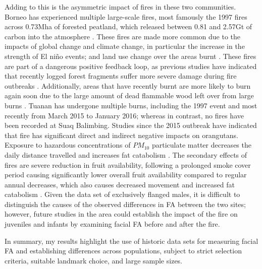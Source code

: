 Adding to this is the asymmetric impact of fires in these two communities. Borneo has experienced multiple large-scale fires, most famously the 1997 fires across 0.73Mha of forested peatland, which released between 0.81 and 2.57Gt of carbon into the atmosphere \citep{Page.2002}. These fires are made more common due to the impacts of global change and climate change, in particular the increase in the strength of El niño events; and land use change over the areas burnt \citep{Collins.2019, Siegert.2001}. These fires are part of a dangerous positive feedback loop, as previous studies have indicated that recently logged forest fragments suffer more severe damage during fire outbreaks \citep{Siegert.2001}. Additionally, areas that have recently burnt are more likely to burn again soon due to the large amount of dead flammable wood left over from large burns \citep{Cochrane.1999}. Tuanan has undergone multiple burns, including the 1997 event and most recently from March 2015 to January 2016; whereas in contrast, no fires have been recorded at Suaq Balimbing. Studies since the 2015 outbreak have indicated that fire has significant direct and indirect negative impacts on orangutans. Exposure to hazardous concentrations of \(PM_{10}\) particulate matter decreases the daily distance travelled and increases fat catabolism \citep{Erb.2018}. The secondary effects of fires are severe reduction in fruit availability, following a prolonged smoke cover period causing significantly lower overall fruit availability compared to regular annual decreases, which also causes decreased movement and increased fat catabolism \citep{Ashbury.2022}.
Given the data set of exclusively flanged males, it is difficult to distinguish the causes of the observed differences in FA between the two sites; however, future studies in the area could establish the impact of the fire on juveniles and infants by examining facial FA before and after the fire.

In summary, my results highlight the use of historic data sets for measuring facial FA and establishing differences across populations, subject to strict selection criteria, suitable landmark choice, and large sample sizes.


